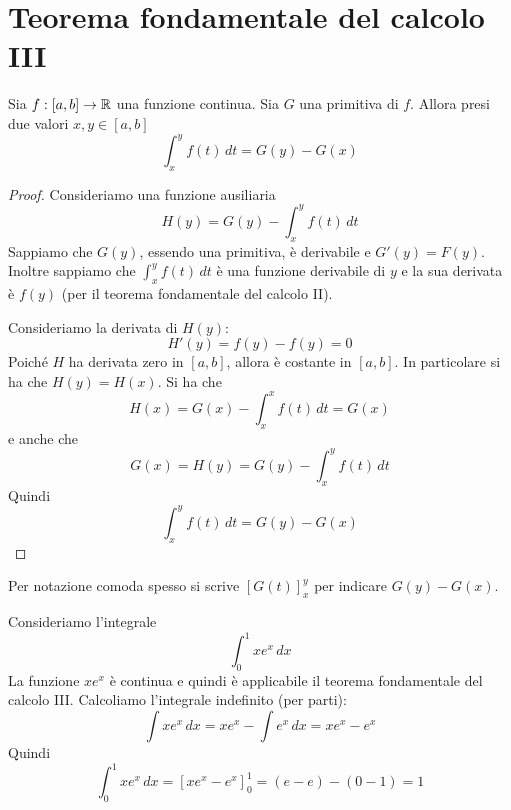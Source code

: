\section{Teorema fondamentale del calcolo III}

\begin{theorem}
Sia $f:[a,b] \to \mathbb R$ una funzione continua. Sia $G$ una primitiva di $f$. Allora presi due valori $x,y \in [a,b]$
\begin{equation*}
\int_x^y f(t) \, dt = G(y) - G(x)
\end{equation*}
\end{theorem}

\begin{proof}
Consideriamo una funzione ausiliaria
\begin{equation*}
H(y) = G(y) - \int_x^y f(t) \, dt
\end{equation*}
Sappiamo che $G(y)$, essendo una primitiva, è derivabile e $G'(y) = F(y)$. Inoltre sappiamo che $\int_x^y f(t) \, dt$ è una funzione derivabile di $y$ e la sua derivata è $f(y)$ (per il teorema fondamentale del calcolo II).

Consideriamo la derivata di $H(y)$:
\begin{equation*}
H'(y) = f(y) - f(y) = 0
\end{equation*}
Poiché $H$ ha derivata zero in $[a,b]$, allora è costante in $[a,b]$. In particolare si ha che $H(y) = H(x)$. Si ha che
\begin{equation*}
H(x) = G(x) - \int_x^x f(t) \, dt = G(x)
\end{equation*}
e anche che
\begin{equation*}
G(x) = H(y) = G(y) - \int_x^y f(t) \, dt
\end{equation*}
Quindi
\begin{equation*}
\int_x^y f(t) \, dt = G(y) - G(x)
\end{equation*}
\end{proof}

Per notazione comoda spesso si scrive $[G(t)]_x^y$ per indicare $G(y)-G(x)$.

\begin{example}
Consideriamo l'integrale
\begin{equation*}
\int_0^1 xe^x \, dx
\end{equation*}
La funzione $xe^x$ è continua e quindi è applicabile il teorema fondamentale del calcolo III. Calcoliamo l'integrale indefinito (per parti):
\begin{equation*}
\int xe^x \, dx = xe^x - \int e^x \, dx = xe^x - e^x
\end{equation*}
Quindi
\begin{equation*}
\int_0^1 xe^x \, dx = [xe^x - e^x]_0^1 = (e-e)-(0-1) = 1
\end{equation*}
\end{example}


